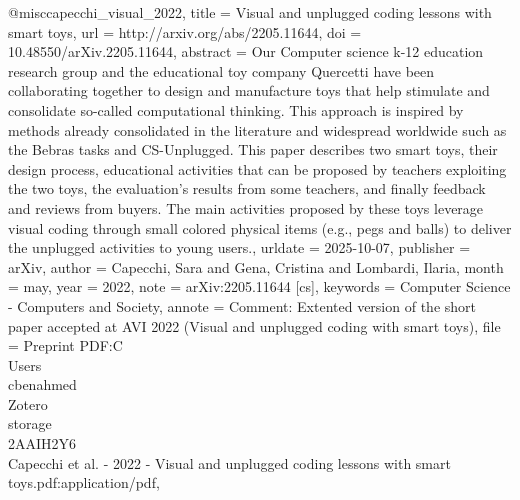@misc{capecchi_visual_2022,
	title = {Visual and unplugged coding lessons with smart toys},
	url = {http://arxiv.org/abs/2205.11644},
	doi = {10.48550/arXiv.2205.11644},
	abstract = {Our Computer science k-12 education research group and the educational toy company Quercetti have been 
collaborating together to design and manufacture toys that help stimulate and consolidate so-called computational thinking. This 
approach is inspired by methods already consolidated in the literature and widespread worldwide such as the Bebras tasks and 
CS-Unplugged. This paper describes two smart toys, their design process, educational activities that can be proposed by teachers 
exploiting the two toys, the evaluation's results from some teachers, and finally feedback and reviews from buyers. The main 
activities proposed by these toys leverage visual coding through small colored physical items (e.g., pegs and balls) to deliver 
the unplugged activities to young users.},
	urldate = {2025-10-07},
	publisher = {arXiv},
	author = {Capecchi, Sara and Gena, Cristina and Lombardi, Ilaria},
	month = may,
	year = {2022},
	note = {arXiv:2205.11644 [cs]},
	keywords = {Computer Science - Computers and Society},
	annote = {Comment: Extented version of the short paper accepted at AVI 2022 (Visual and unplugged coding with smart 
toys)},
	file = {Preprint PDF:C\:\\Users\\cbenahmed\\Zotero\\storage\\2AAIH2Y6\\Capecchi et al. - 2022 - Visual and unplugged 
coding lessons with smart toys.pdf:application/pdf},
}

